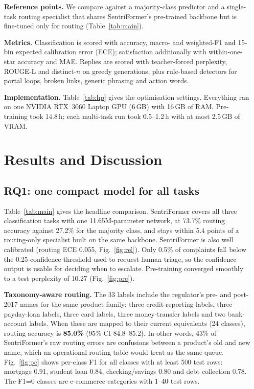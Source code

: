 \documentclass[conference]{IEEEtran}
\begin{document}
\textbf{Reference points.} We compare against a majority-class predictor and a single-task routing specialist that shares SentriFormer's pre-trained backbone but is fine-tuned only for routing (Table~\ref{tab:main}).

\textbf{Metrics.} Classification is scored with accuracy, macro- and weighted-F1 and 15-bin expected calibration error (ECE); satisfaction additionally with within-one-star accuracy and MAE. Replies are scored with teacher-forced perplexity, ROUGE-L and distinct-$n$ on greedy generations, plus rule-based detectors for portal loops, broken links, generic phrasing and action words.

\textbf{Implementation.} Table~\ref{tab:hp} gives the optimisation settings. Everything ran on one NVIDIA RTX~3060 Laptop GPU (6\,GB) with 16\,GB of RAM. Pre-training took 14.8\,h; each multi-task run took 0.5--1.2\,h with at most 2.5\,GB of VRAM.



\FloatBarrier
\section{Results and Discussion}

\subsection{RQ1: one compact model for all tasks}
Table~\ref{tab:main} gives the headline comparison. SentriFormer covers all three classification tasks with one 11.65M-parameter network, at 73.7\% routing accuracy against 27.2\% for the majority class, and stays within 5.4 points of a routing-only specialist built on the same backbone. SentriFormer is also well calibrated (routing ECE 0.055, Fig.~\ref{fig:rel}). Only 0.5\% of complaints fall below the 0.25-confidence threshold used to request human triage, so the confidence output is usable for deciding when to escalate. Pre-training converged smoothly to a test perplexity of 10.27 (Fig.~\ref{fig:pre}).



\textbf{Taxonomy-aware routing.} The 33 labels include the regulator's pre- and post-2017 names for the same product family: three credit-reporting labels, three payday-loan labels, three card labels, three money-transfer labels and two bank-account labels. When these are mapped to their current equivalents (24 classes), routing accuracy is \textbf{85.0\%} (95\% CI 84.8--85.2). In other words, 43\% of SentriFormer's raw routing errors are confusions between a product's old and new name, which an operational routing table would treat as the same queue. Fig.~\ref{fig:pc} shows per-class F1 for all classes with at least 500 test rows: mortgage 0.91, student loan 0.84, checking/savings 0.80 and debt collection 0.78. The F1=0 classes are e-commerce categories with 1--40 test rows.
\end{document}
